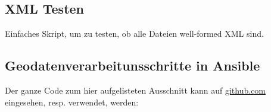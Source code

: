 \subsection{XML Testen}
Einfaches Skript, um zu testen, ob alle Dateien well-formed XML sind.

\subsection{Geodatenverarbeitunsschritte in Ansible}
Der ganze Code zum hier aufgelisteten Ausschnitt kann auf \href{https://github.com/bfh-semesterarbeit/spot-geoprocessing}{github.com} eingesehen, resp. verwendet, werden:


